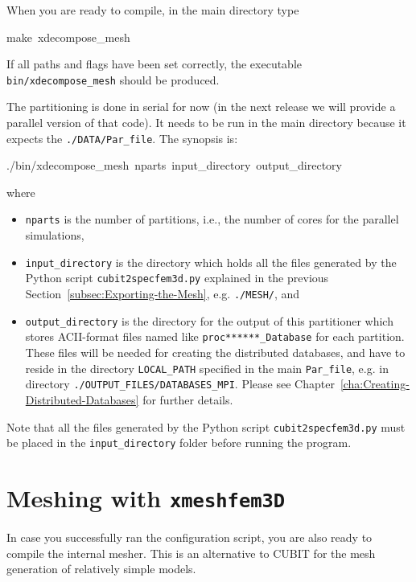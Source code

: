 When you are ready to compile, in the main directory type
\begin{lyxcode}
{\small make~xdecompose\_mesh}{\small \par}
\end{lyxcode}
If all paths and flags have been set correctly, the executable \texttt{bin/xdecompose\_mesh}
should be produced.

The partitioning is done in serial for now (in the next release we
will provide a parallel version of that code). It needs to be run in the main directory because it expects the \texttt{./DATA/Par\_file}. The synopsis is:
\begin{lyxcode}
./bin/xdecompose\_mesh~nparts~input\_directory~output\_directory
\end{lyxcode}
where
\begin{itemize}
\item \texttt{nparts} is the number of partitions, i.e., the number of cores
for the parallel simulations,
\item \texttt{input\_directory} is the directory which holds all the files
generated by the Python script \texttt{cubit2specfem3d.py} explained
in the previous Section~\ref{subsec:Exporting-the-Mesh}, e.g. \texttt{./MESH/},
and
\item \texttt{output\_directory} is the directory for the output of this
partitioner which stores ACII-format files named like \texttt{proc{*}{*}{*}{*}{*}{*}\_Database}
for each partition. These files will be needed for creating the distributed
databases, and have to reside in the directory \texttt{LOCAL\_PATH}
specified in the main \texttt{Par\_file}, e.g. in directory \texttt{./OUTPUT\_FILES/DATABASES\_MPI}.
Please see Chapter~\ref{cha:Creating-Distributed-Databases} for
further details.
\end{itemize}
Note that all the files generated by the Python script \texttt{cubit2specfem3d.py}
must be placed in the \texttt{input\_directory} folder before running
the program.


\section{Meshing with \texttt{xmeshfem3D}}\label{cha:Running-the-Mesher-Meshfem3D}

In case you successfully ran the configuration script, you are also
ready to compile the internal mesher. This is an alternative to CUBIT
for the mesh generation of relatively simple models.

